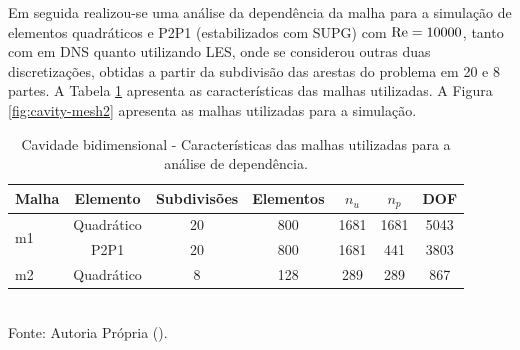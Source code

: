 Em seguida realizou-se uma análise da dependência da malha para a simulação de elementos quadráticos e P2P1 (estabilizados com SUPG) com $\mathrm{Re}=10000$, tanto com em DNS quanto utilizando LES, onde se considerou outras duas discretizações, obtidas a partir da subdivisão das arestas do problema em 20 e 8 partes. A Tabela \ref{tab:cavity-mesh2} apresenta as características das malhas utilizadas. A Figura \ref{fig:cavity-mesh2} apresenta as malhas utilizadas para a simulação.

\begin{table}[h!]
    \centering
    \caption{Cavidade bidimensional - Características das malhas utilizadas para a análise de dependência.}
    \begin{tabular}{lcccccc}
        \hline
        Malha               & Elemento   & Subdivisões & Elementos & $n_u$ & $n_p$ & DOF  \\\hline
        \multirow{2}{*}{m1} & Quadrático & 20          & 800       & 1681  & 1681  & 5043 \\
                            & P2P1       & 20          & 800       & 1681  & 441   & 3803 \\\hline
        m2                  & Quadrático & 8           & 128       & 289   & 289   & 867  \\\hline
    \end{tabular}
    \\Fonte: Autoria Própria (\the\year).
    \label{tab:cavity-mesh2}
\end{table}

